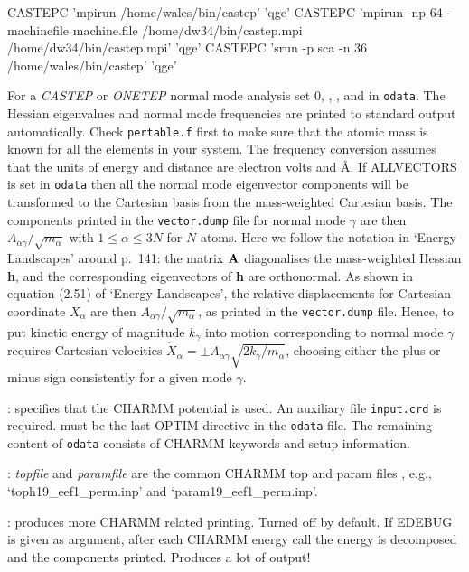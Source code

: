 {{{\obeylines
CASTEPC 'mpirun /home/wales/bin/castep' 'qge'
CASTEPC 'mpirun -np 64 -machinefile machine.file /home/dw34/bin/castep.mpi /home/dw34/bin/castep.mpi' 'qge'
CASTEPC 'srun -p sca -n 36 /home/wales/bin/castep' 'qge'
}

For a {\it CASTEP\/} or {\it ONETEP} normal mode analysis set
{ 0\/}, {}, {}, and {} in {\tt odata}. 
The Hessian eigenvalues and normal mode frequencies are printed to standard output automatically.
Check {\tt pertable.f} first to make sure that the atomic mass is known for all the
elements in your system. The frequency conversion assumes that the units of energy and
distance are electron volts and \AA.
If { ALLVECTORS\/} is set in {\tt odata} then all
the normal mode eigenvector components will be transformed to the Cartesian basis from the
mass-weighted Cartesian basis.
The components printed in the {\tt vector.dump} file for normal mode $\gamma$
are then $A_{\alpha\gamma}/\sqrt{m_\alpha}$ with $1\le \alpha \le 3N$ for $N$
atoms. Here we follow the notation in `Energy Landscapes' around
p.~141: the matrix ${\bf A}$ diagonalises the mass-weighted Hessian {\bf h},
and the corresponding eigenvectors of {\bf h} are orthonormal.
As shown in equation (2.51) of `Energy Landscapes', the relative displacements
for Cartesian coordinate $X_\alpha$ are then $A_{\alpha\gamma}/\sqrt{m_\alpha}$,
as printed in the {\tt vector.dump} file. Hence, to put kinetic energy of
magnitude $k_\gamma$ into motion corresponding to normal mode $\gamma$ requires
Cartesian velocities $\dot{X}_\alpha = \pm A_{\alpha\gamma} \sqrt{2k_\gamma/m_\alpha}$,
choosing either the plus or minus sign consistently for  a given mode $\gamma$.

: specifies that the CHARMM potential is used. An auxiliary file 
{\tt input.crd} is required.  must be the last OPTIM directive in the 
{\tt odata} file. The remaining content of {\tt odata} consists of CHARMM keywords and
setup information.

:  {\it topfile} and {\it paramfile} are the 
common CHARMM top and param files , e.g., `toph19\_eef1\_perm.inp' and `param19\_eef1\_perm.inp'.

: produces more CHARMM related printing. Turned off by default.
If EDEBUG is given as argument, after each CHARMM energy call the energy is decomposed
and the components printed. Produces a lot of output!

}}
